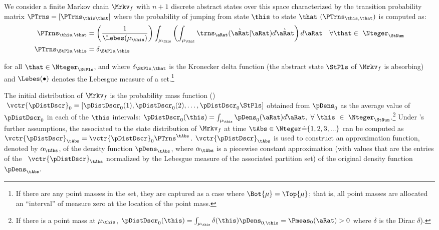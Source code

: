 \documentclass[../BufferStockTheory.tex]{subfiles}\usepackage{ApndxSteadyState}
\begin{document}
  We consider a finite Markov chain $\Mrkv_{f}$ with $n+1$ discrete abstract states over this space characterized by the transition probability matrix $\PTrns = [\PTrns_{\this\that}]$ where the probability of jumping from state $\this$ to state $\that$ $(\PTrns_{\this,\that})$ is computed as:
  \begin{equation}\begin{gathered}\begin{aligned}
    \PTrns_{\this,\that} &= \left(\frac{1}{\Lebes(\SetSub_{\this})}\right)\int_{\SetSub_{\this}}\left(\int_{\SetSub_{\that}}\trns_{\point}(\Nxt{\point}|\point){d\Nxt{\point}}\right){d\point}~~~\forall\that \in~ \Nteger_{\StNum} \label{eq:thisTOthat}
    \\ \PTrns_{\StPls,\this} &= \delta_{\StPls,\this}\notag
  \end{aligned}\end{gathered}\end{equation}{}
  
\noindent for all $\that \in \Nteger_{\StPls}$, and where $\delta_{\StPls,\that}$ is the Kronecker delta function (the abstract state $\StPls$ of $\Mrkv_{f}$ is absorbing) 
  and $\Lebes(\bullet)$ denotes the Lebesgue measure of a set.\footnote{If there are any point masses in the set, they are captured as a case where $\Bot{\SetSub}=\Top{\SetSub}$; that is, all point masses are allocated an ``interval'' of measure zero at the location of the point mass.}

  The initial distribution of $\Mrkv_{f}$ is the probability mass function (\pmf) $~\vctr{\pDistDscr}_{0} = [\pDistDscr_{0}(1),\pDistDscr_{0}(2),\dots,\pDistDscr_{0}\StPls]$ obtained from $\pDens_{0}$ as the average value of $\pDistDscr_{0}$ in each of the $\this$ intervals: $\pDistDscr_{0}(\this)=\int_{\SetSub_{\this}} \pDens_{0}(\point)d\point ,~\forall~\this~\in~\Nteger_{\StNum}$.\footnote{If there is a point mass at $\SetSub_{\this}$, $\pDistDscr_{0}(\this)=\int_{\SetSub_\this}\delta(\this) \pDens_{0,\this}=\Pmeas_{0}(\point)>0$ where $\delta$ is the Dirac $\delta$).}   Under \cite{eaDiscretize}'s further assumptions, the {\pmf} associated to the state distribution of $\Mrkv_{f}$ at time $\tAbs \in \Nteger \dot{=} \{1,2,3,...\}$ can be computed as $\vctr{\pDistDscr}_{\tAbs}=\vctr{\pDistDscr}_{0}\PTrns^{\tAbs}$.  $\vctr{\pDistDscr}_{\tAbs}$ is used to construct an approximation function, denoted by $\pContAprx_{\tAbs}$, of the density function $\pDens_{\tAbs}$, where $\pContAprx_{\tAbs}$ is a piecewise constant approximation (with values that are the entries of the {\pmf}~$\vctr{\pDistDscr}_{\tAbs}$ normalized by the Lebesgue measure of the associated partition set) of the original density function $\pDens_{\tAbs}.$  %
\end{document}
